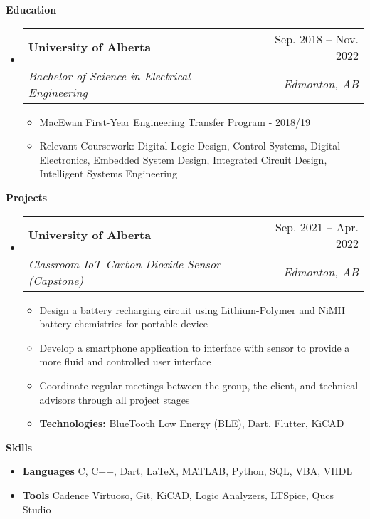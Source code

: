 \documentclass[letterpaper,12pt]{article}[leftmargin=*]
\makeatletter
\def \entryspacing {-0pt}
\renewcommand{\section}[2]{\vspace{5pt}
  \colorbox{secondary}{\color{white}\raggedbottom\normalsize\textbf{{#1}{\hspace{7pt}#2}}}
}
\newcommand{\resumeEntryStart}{\begin{itemize}[leftmargin=2.5mm]}
\newcommand{\resumeEntryEnd}{\end{itemize}\vspace{\entryspacing}}
\newcommand{\resumeItemListStart}{\begin{itemize}[leftmargin=4.5mm]}
\newcommand{\resumeItemListEnd}{\end{itemize}}
\newcommand{\resumeItem}[1]{
  \item\small{
    {#1 \vspace{-2pt}}
  }
}
\newcommand{\resumeEntryTSDL}[4]{
  \vspace{-1pt}\item[]
    \begin{tabularx}{0.97\textwidth}{X@{\hspace{60pt}}r}
      \textbf{\color{primary}#1} & {\firabook\color{accent}\small#2} \\
      \textit{\color{accent}\small#3} & \textit{\color{accent}\small#4} \\
    \end{tabularx}\vspace{-6pt}
}
\newcommand{\resumeEntryS}[2]{
  \item[]\small{
    \textbf{\color{primary}#1 }{ #2 \vspace{-6pt}}
  }
}
\makeatother
\begin{document}
\section{\faGraduationCap}{Education}

  \resumeEntryStart
    \resumeEntryTSDL
      {University of Alberta}{Sep. 2018 -- Nov. 2022}
      {Bachelor of Science in Electrical Engineering}{Edmonton, AB}
  \resumeItemListStart
    \resumeItem{MacEwan First-Year Engineering Transfer Program - 2018/19}
    \resumeItem{Relevant Coursework: Digital Logic Design, Control Systems, Digital Electronics, Embedded System Design, Integrated Circuit Design, Intelligent Systems Engineering}
  \resumeItemListEnd
  \resumeEntryEnd

\section{\faFlask}{Projects}

  \resumeEntryStart
    \resumeEntryTSDL
      {University of Alberta}{Sep. 2021 -- Apr. 2022}
      {Classroom IoT Carbon Dioxide Sensor (Capstone)}{Edmonton, AB}
    \resumeItemListStart
      \resumeItem {Design a battery recharging circuit using Lithium-Polymer and NiMH battery chemistries for portable device}
      \resumeItem {Develop a smartphone application to interface with sensor to provide a more fluid and controlled user interface}
      \resumeItem {Coordinate regular meetings between the group, the client, and technical advisors through all project stages}
      \resumeItem {\textbf{Technologies:} BlueTooth Low Energy (BLE), Dart, Flutter, KiCAD}
    \resumeItemListEnd
  \resumeEntryEnd

\section{\faGears}{Skills}

 \resumeEntryStart
  \resumeEntryS{Languages } {C, C++, Dart, LaTeX, MATLAB, Python, SQL, VBA, VHDL}
  \resumeEntryS{Tools } {Cadence Virtuoso, Git, KiCAD, Logic Analyzers, LTSpice, Qucs Studio}
 \resumeEntryEnd

\end{document}
